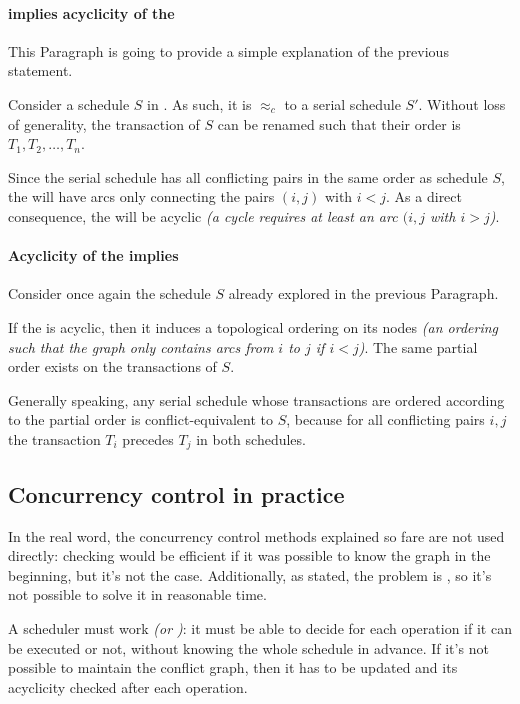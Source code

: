 \documentclass[english]{article}
\begin{document}
\paragraph{\CSR implies acyclicity of the \CG}

This Paragraph is going to provide a simple explanation of the previous statement.

Consider a schedule \(S\) in \CSR.
As such, it is \(\approx_c\) to a serial schedule \(S'\).
Without loss of generality, the transaction of \(S\) can be renamed such that their order is \(T_1, T_2, \dots, T_n\).

Since the serial schedule has all conflicting pairs in the same order as schedule \(S\), the \CG will have arcs only connecting the pairs \((i, j)\) with \(i < j\).
As a direct consequence, the \CG will be acyclic \textit{(a cycle requires at least an arc \((i, j\) with \(i > j\))}.

\paragraph{Acyclicity of the \CG implies \CSR}

Consider once again the schedule \(S\) already explored in the previous Paragraph.

If the \CG is acyclic, then it induces a topological ordering on its nodes \textit{(an ordering such that the graph only contains arcs from \(i\) to \(j\) if \(i < j\))}.
The same partial order exists on the transactions of \(S\).

Generally speaking, any serial schedule whose transactions are ordered according to the partial order is conflict-equivalent to \(S\), because for all conflicting pairs \(i, j\) the transaction \(T_i\) precedes \(T_j\) in both schedules.

\subsection{Concurrency control in practice}

In the real word, the concurrency control methods explained so fare are not used directly: \CSR checking would be efficient if it was possible to know the graph in the beginning, but it's not the case.
Additionally, as stated, the problem is \NPC, so it's not possible to solve it in reasonable time.

A scheduler must work  \textit{(or )}: it must be able to decide for each operation if it can be executed or not, without knowing the whole schedule in advance.
If it's not possible to maintain the conflict graph, then it has to be updated and its acyclicity checked after each operation.
\end{document}
